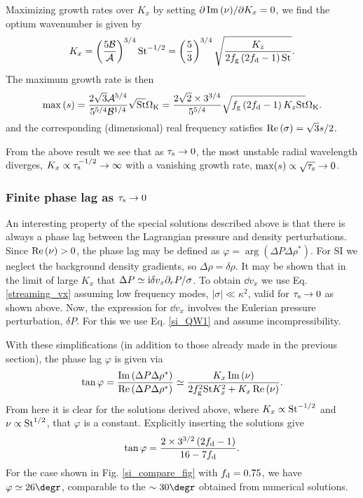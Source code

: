 Maximizing growth rates over $K_x$ by setting $\partial \operatorname{Im}{(\nu)}/\partial K_x
= 0$, we find the optium wavenumber is given by
\begin{align}
  K_x = \left(\frac{5\mathcal{B}}{\mathcal{A}}\right)^{3/4}\mathrm{St}^{-1/2} =
  \left(\frac{5}{3}\right)^{3/4}\sqrt{\frac{K_z}{2f_\mathrm{g}\left(2f_\mathrm{d}-1\right)\mathrm{St}}}. 
\end{align}
The maximum growth rate is then 
\begin{align}
  \mathrm{max}\left(s\right) =
  \frac{2\sqrt{3}\mathcal{A}^{5/4}}{5^{5/4}\mathcal{B}^{1/4}}\sqrt{\mathrm{St}}\Omega_{\rm K} =
  \frac{2\sqrt{2}\times3^{3/4}}{5^{5/4}}\sqrt{f_\mathrm{g}\left(2f_\mathrm{d}-1\right)K_z\mathrm{St}}\Omega_{\rm K}.
\end{align}
and the corresponding (dimensional) real frequency satisfies
$\operatorname{Re}{(\sigma)} =  \sqrt{3}s/2$. 

From the above result we see that as $\tau_\mathrm{s}\to0$, the most unstable
radial wavelength diverges, $K_x\propto \tau_\mathrm{s}^{-1/2} \to \infty$ with
a vanishing growth rate, $\mathrm{max}(s)\propto \sqrt{\tau_\mathrm{s}}\to 0$.   



\subsubsection{Finite phase lag as $\tau_\mathrm{s}\to 0$}  
An interesting property of the special solutions described above is
that there is always a phase lag between the Lagrangian pressure and
density perturbations. Since $\operatorname{Re}{(\nu)}>0$, the phase lag may be
defined as $\varphi = \arg{\left(\Delta P \Delta \rho^*\right)}$. For
SI we neglect the background density gradients, so $\Delta\rho = 
\delta\rho$. It may be shown that in the limit of large $K_x$ 
that $\Delta P \simeq \mathrm{i} \delta v_x \partial_rP/\sigma$. To obtain $\dd v_x$ we use Eq. \ref{streaming_vx} 
assuming low frequency modes, $|\sigma|\ll \kappa^2$, valid for
$\tau_\mathrm{s}\to 0$ as shown above. Now, the expression for $\dd v_x$ involves
the Eulerian pressure perturbation, $\delta P$. For this we use
Eq. \ref{si_QW1} and assume incompressibility. 

With these simplifications (in addition to those already made in the
previous section), the phase lag $\varphi$ is given via 
\begin{align}
  \tan{\varphi} = \frac{\operatorname{Im}{\left(\Delta
        P\Delta\rho^*\right)}}{\operatorname{Re}{\left(\Delta
        P\Delta\rho^*\right)}}\simeq\frac{K_x\operatorname{Im}{(\nu)}}{2f_\mathrm{g}^2\mathrm{St}
      K_x^2 + K_x \operatorname{Re}{(\nu)}}. 
\end{align}
From here it is clear for the solutions derived above, where
$K_x\propto \mathrm{St}^{-1/2}$ and $\nu \propto \mathrm{St}^{1/2}$, that $\varphi$ is
a constant. Explicitly inserting the solutions give 
\begin{align}
\tan{\varphi} = \frac{2\times 3^{3/2}\left(2f_\mathrm{d}-1\right)}{16 -
  7f_\mathrm{d}}. 
\end{align}
For the case shown in Fig. \ref{si_compare_fig} with $f_\mathrm{d}=0.75$, we
have $\varphi\simeq 26\degr$, comparable to the $\sim 30\degr$
obtained from numerical solutions. 

